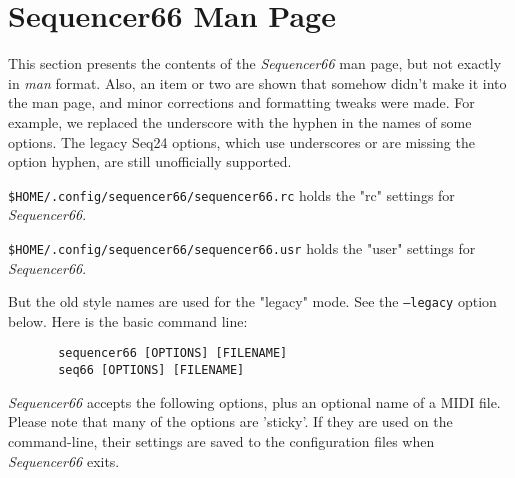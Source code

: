 %
%
%

\section{Sequencer66 Man Page}
\label{sec:seq66_man_page}

   This section presents the contents of the \textsl{Sequencer66} man page, but
   not exactly in \textsl{man} format.  Also, an item or two are shown that
   somehow didn't make it into the man page, and minor corrections and
   formatting tweaks were made.
   For example, we replaced the underscore with the hyphen in the names of some
   options.  The legacy Seq24 options, which use underscores or are missing the
   option hyphen, are still unofficially supported.

   \texttt{\$HOME/.config/sequencer66/sequencer66.rc} holds the "rc" settings
   for \textsl{Sequencer66}.

   \texttt{\$HOME/.config/sequencer66/sequencer66.usr} holds the "user" settings
   for \textsl{Sequencer66}.

   But the old style names are used for the "legacy" mode.  See the
   \texttt{--legacy} option below. Here is the basic command line:


   \begin{verbatim}
       sequencer66 [OPTIONS] [FILENAME]
       seq66 [OPTIONS] [FILENAME]
   \end{verbatim}

   \textsl{Sequencer66} accepts the following options, plus an optional name of
   a MIDI file.  Please note that many of the options are 'sticky'.  If they
   are used on the command-line, their settings are saved to the configuration
   files when \textsl{Sequencer66} exits.

   \setcounter{ItemCounter}{0}      %

